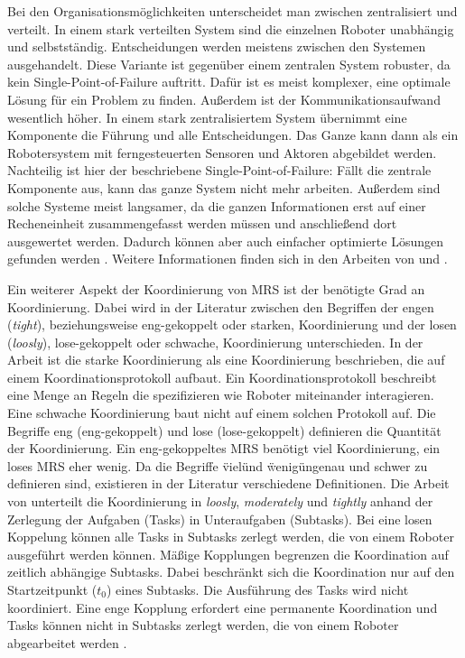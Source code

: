 Bei den Organisationsmöglichkeiten unterscheidet man zwischen zentralisiert und verteilt. In einem stark verteilten System sind die einzelnen Roboter unabhängig und selbstständig. Entscheidungen werden meistens zwischen den Systemen ausgehandelt. Diese Variante ist gegenüber einem zentralen System robuster, da kein Single-Point-of-Failure auftritt. Dafür ist es meist komplexer, eine optimale Lösung für ein Problem zu finden. Außerdem ist der Kommunikationsaufwand wesentlich höher. In einem stark zentralisiertem System übernimmt eine Komponente die Führung und alle Entscheidungen. Das Ganze kann dann als ein Robotersystem mit ferngesteuerten Sensoren und Aktoren abgebildet werden. Nachteilig ist hier der beschriebene Single-Point-of-Failure: Fällt die zentrale Komponente aus, kann das ganze System nicht mehr arbeiten. Außerdem sind solche Systeme meist langsamer, da die ganzen Informationen erst auf einer Recheneinheit zusammengefasst werden müssen und anschließend dort ausgewertet werden. Dadurch können aber auch einfacher optimierte Lösungen gefunden werden \citep{lundh2006plan}. Weitere Informationen finden sich in den Arbeiten von \cite{farinelli2004multirobot} und \cite{dias2003comparative}. 

Ein weiterer Aspekt der Koordinierung von MRS ist der benötigte Grad an Koordinierung. Dabei wird in der Literatur zwischen den Begriffen der engen (\textit{tight}), beziehungsweise eng-gekoppelt oder starken, Koordinierung und der losen (\textit{loosly}), lose-gekoppelt oder schwache, Koordinierung unterschieden. In der Arbeit \cite{farinelli2004multirobot} ist die starke Koordinierung als eine Koordinierung beschrieben, die auf einem Koordinationsprotokoll aufbaut. Ein Koordinationsprotokoll beschreibt eine Menge an Regeln die spezifizieren wie Roboter miteinander interagieren. Eine schwache Koordinierung baut nicht auf einem solchen Protokoll auf. Die Begriffe eng (eng-gekoppelt) und lose (lose-gekoppelt) definieren die Quantität der Koordinierung. Ein eng-gekoppeltes MRS benötigt viel Koordinierung, ein loses MRS eher wenig. Da die Begriffe \"viel\" und \"wenig\" ungenau und schwer zu definieren sind, existieren in der Literatur verschiedene Definitionen. Die Arbeit von \cite{kalra2004hoplites} unterteilt die Koordinierung in \textit{loosly}, \textit{moderately} und \textit{tightly} anhand der Zerlegung der Aufgaben (Tasks) in Unteraufgaben (Subtasks). Bei eine losen Koppelung können alle Tasks in Subtasks zerlegt werden, die von einem Roboter ausgeführt werden können. Mäßige Kopplungen begrenzen die Koordination auf zeitlich abhängige Subtasks. Dabei beschränkt sich die Koordination nur auf den Startzeitpunkt ($t_0$) eines Subtasks. Die Ausführung des Tasks wird nicht koordiniert. Eine enge Kopplung erfordert eine permanente Koordination und Tasks können nicht in Subtasks zerlegt werden, die von einem Roboter abgearbeitet werden \citep{lundh2006plan}.

